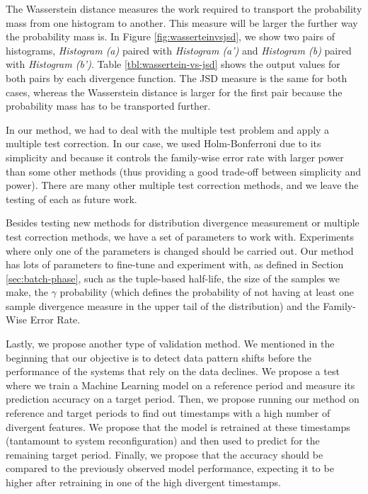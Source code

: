 \documentclass[sigconf]{acmart}
\begin{document}
The Wasserstein distance measures the work required to transport the probability mass from one histogram to another. This measure will be larger the further way the probability mass is. In Figure \ref{fig:wasserteinvsjsd}, we show two pairs of histograms, \textit{Histogram (a)} paired with \textit{Histogram (a')} and \textit{Histogram (b)} paired with \textit{Histogram (b')}. Table \ref{tbl:wassertein-vs-jsd} shows the output values for both pairs by each divergence function. The JSD measure is the same for both cases, whereas the Wasserstein distance is larger for the first pair because the probability mass has to be transported further.

In our method, we had to deal with the multiple test problem and apply a multiple test correction. In our case, we used Holm-Bonferroni due to its simplicity and because it controls the family-wise error rate with larger power than some other methods (thus providing a good trade-off between simplicity and power). There are many other multiple test correction methods, and we leave the testing of each as future work.

Besides testing new methods for distribution divergence measurement or multiple test correction methods, we have a set of parameters to work with. Experiments where only one of the parameters is changed should be carried out. Our method has lots of parameters to fine-tune and experiment with, as defined in Section \ref{sec:batch-phase}, such as the tuple-based half-life, the size of the samples we make, the $\gamma$ probability (which defines the probability of not having at least one sample divergence measure in the upper tail of the distribution) and the Family-Wise Error Rate.

Lastly, we propose another type of validation method. We mentioned in the beginning that our objective is to detect data pattern shifts before the performance of the systems that rely on the data declines. We propose a test where we train a Machine Learning model on a reference period and measure its prediction accuracy on a target period. Then, we propose running our method on reference and target periods to find out timestamps with a high number of divergent features. We propose that the model is retrained at these timestamps (tantamount to system reconfiguration) and then used to predict for the remaining target period. Finally, we propose that the accuracy should be compared to the previously observed model performance, expecting it to be higher after retraining in one of the high divergent timestamps.





\end{document}
